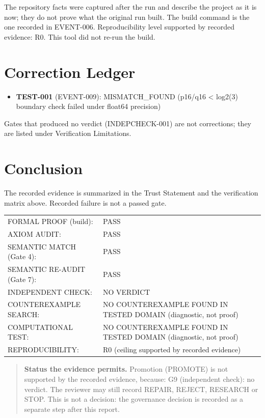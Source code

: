 \documentclass[11pt]{article}
\begin{document}
The repository facts were captured after the run and describe the project as it is now; they do not prove what the original run built. The build command is the one recorded in EVENT-006.
Reproducibility level supported by recorded evidence: R0. This tool did not re-run the build.
\section{Correction Ledger}
\begin{itemize}
\item \textbf{TEST-001} (EVENT-009): MISMATCH\_FOUND (p16/q16 < log2(3) boundary check failed under float64 precision)
\end{itemize}
Gates that produced no verdict (INDEPCHECK-001) are not corrections; they are listed under Verification Limitations.


\section{Conclusion}
The recorded evidence is summarized in the Trust Statement and the verification matrix above. Recorded failure is not a passed gate.
\begin{center}\begin{tabular}{@{}p{}p{}@{}}
FORMAL PROOF (build): & PASS \\
AXIOM AUDIT: & PASS \\
SEMANTIC MATCH (Gate 4): & PASS \\
SEMANTIC RE-AUDIT (Gate 7): & PASS \\
INDEPENDENT CHECK: & NO VERDICT \\
COUNTEREXAMPLE SEARCH: & NO COUNTEREXAMPLE FOUND IN TESTED DOMAIN (diagnostic, not proof) \\
COMPUTATIONAL TEST: & NO COUNTEREXAMPLE FOUND IN TESTED DOMAIN (diagnostic, not proof) \\
REPRODUCIBILITY: & R0 (ceiling supported by recorded evidence) \\
\end{tabular}\end{center}
\begin{quote}\textbf{Status the evidence permits.} Promotion (PROMOTE) is not supported by the recorded evidence, because: G9 (independent check): no verdict. The reviewer may still record REPAIR, REJECT, RESEARCH or STOP. This is not a decision: the governance decision is recorded as a separate step after this report.\end{quote}
\appendix
\end{document}

